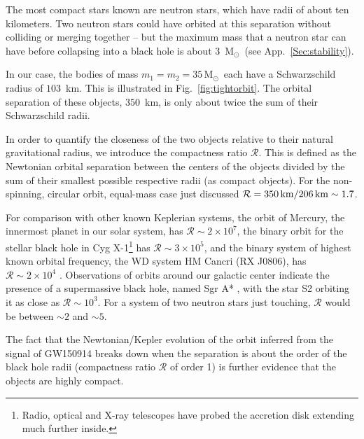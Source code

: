 \documentclass{andp2012}%
\newcommand{\refigure}[1]{Fig.~\ref{#1}}
\newcommand{\refapp}[1]{App.\ \ref{#1}}
\def\BH{black hole }		\def\BHs{black holes }			\def\BHns{black hole}		\def\BHsns{black holes}		\def\GW{gravitational wave }		\def\GWs{gravitational waves }				\def\GWns{gravitational wave}		\def\GWsns{gravitational waves}		\def\LR{light ring }		\def\ISCO{innermost stable circular orbit }		\def\NS{neutron star }		\def\NSs{neutron stars }		\def\GR{general relativity }
\newcommand{\Msun}{\ensuremath{\mathrm{M}_\odot\,}}
\newcommand{\MCOMPONENTAPPROX}{\ensuremath{35\, \Msun}}
\newcommand{\ORBITALSEPAPPROX}{\ensuremath{350}} %
\begin{document}
The most compact stars known are neutron stars, which have radii of
about ten kilometers.  Two neutron stars could have orbited at this
separation without colliding or merging together -- but the maximum
mass that a neutron star can have before collapsing into a black hole
is about 3~$\Msun\!\!$ (see \refapp{Sec:stability}).

In our case, the bodies of mass
$m_1 = m_2 = \MCOMPONENTAPPROX$ each have a
Schwarzschild radius of $103$~km.
This is illustrated in \refigure{fig:tightorbit}.
The orbital separation of these objects, \ORBITALSEPAPPROX~km,
is only about twice the sum of their Schwarzschild radii.

In order to quantify the closeness of the two
objects relative to their natural gravitational radius, we
introduce the compactness ratio $\mathcal{R}$.
This is defined as the
Newtonian orbital separation between the centers of the objects
divided by the sum of their smallest possible respective radii (as compact objects).
For the non-spinning, circular orbit, equal-mass case just discussed
$\mathcal{R} = {\ORBITALSEPAPPROX \, \rm km}/{206 \, \rm km} \sim 1.7$.

For comparison with other
known Keplerian systems,
the orbit of Mercury,
the innermost planet in our solar system,
has $\mathcal{R} \sim 2 \times 10^7$,
the binary orbit for
the stellar \BH in Cyg X-1\footnote{Radio,
optical and X-ray telescopes
have probed the accretion disk extending
much further inside\cite{CygX1}.
}
has $\mathcal{R} \sim 3\times10^5$,
and the binary system of highest known orbital frequency,
the WD system HM Cancri (RX J0806),
has $\mathcal{R} \sim 2 \times 10^4$
\cite{Postnov:2014tza}.
Observations of orbits around our galactic center
indicate the presence of a supermassive \BHns,
named Sgr A* \cite{Gillessen:2008qv, Ghez:2008ms},
with the star S2 orbiting it
as close as
$\mathcal{R} \sim 10^3$.
For a system of two \NSs just touching,
$\mathcal{R}$ would be between
$\sim\!2$ and $\sim\!5$.


The fact that the Newtonian/Kepler evolution of the
orbit inferred from the signal of GW150914
breaks down when the separation is about the order of the
\BH radii (compactness ratio $\mathcal{R}$ of order 1) is further
evidence that the objects are highly compact.
\end{document}
